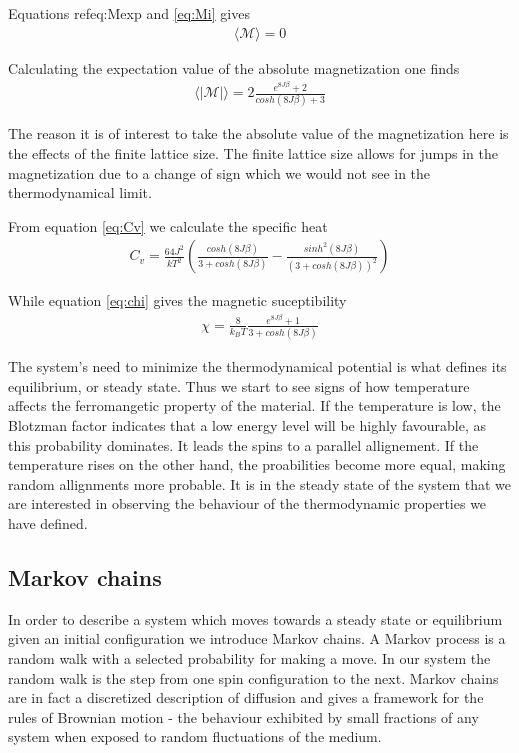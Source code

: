 \documentclass[norsk, 10pt, twocolumn, a4paper]{revtex4}
\begin{document}
Equations ref{eq:Mexp} and \ref{eq:Mi} gives
\begin{align*}
    \langle \mathscr{M} \rangle = 0 
\end{align*}

Calculating the expectation value of the absolute magnetization one finds
\begin{align*}
    \langle |\mathscr{M}| \rangle = 2\frac{e^{8J\beta} + 2}{cosh(8J\beta) + 3}
\end{align*}

The reason it is of interest to take the absolute value of the magnetization here is the effects of the finite lattice size.
The finite lattice size allows for jumps in the magnetization due to a change of sign which we would not see in the
thermodynamical limit.

From equation \ref{eq:Cv} we calculate the specific heat
\begin{align}
    C_v = \frac{64J^2}{kT^2}(\frac{cosh(8J\beta)}{3+cosh(8J\beta)} - \frac{sinh^2(8J\beta)}{(3+cosh(8J\beta))^2})
\end{align}

While equation \ref{eq:chi} gives the magnetic suceptibility
\begin{align*}
    \chi = \frac{8}{k_BT}\frac{e^{8J\beta}+1}{3+cosh(8J\beta)}
\end{align*}

The system's need to minimize the thermodynamical potential is what defines its equilibrium, or steady state.
Thus we start to see signs of how temperature affects the ferromangetic property of the material.
If the temperature is low, the Blotzman factor indicates that a low energy level will be highly favourable, as this
probability dominates. It leads the spins to a parallel allignement. If the temperature rises on the other hand, the
proabilities become more equal, making random allignments more probable.
It is in the steady state of the system that we are interested in observing the behaviour of the thermodynamic properties
we have defined.

\subsection{Markov chains}
In order to describe a system which moves towards a steady state or equilibrium 
given an initial configuration we introduce Markov chains.
A Markov process is a random walk with a selected probability for making
a move. In our system the random walk is the step from one spin configuration to the next.
Markov chains are in fact a discretized description of diffusion and gives a framework
for the rules of Brownian motion - the behaviour exhibited by small fractions of any system
when exposed to random fluctuations of the medium.
\end{document}
